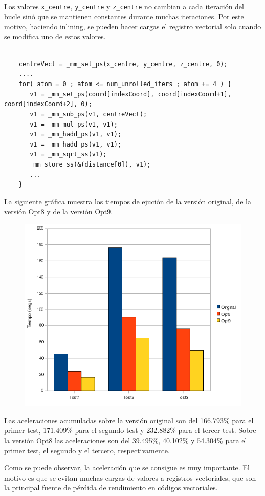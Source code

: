 Los valores \texttt{x\_centre}, \texttt{y\_centre} y \texttt{z\_centre} no
cambian a cada iteraci\'{o}n del bucle sin\'{o} que se mantienen constantes
durante muchas iteraciones. Por este motivo, haciendo inlining, se pueden
hacer cargas el registro vectorial solo cuando se modifica uno de estos valores.

\begin{lstlisting}

    centreVect = _mm_set_ps(x_centre, y_centre, z_centre, 0);
    ....
    for( atom = 0 ; atom <= num_unrolled_iters ; atom += 4 ) {
       v1 = _mm_set_ps(coord[indexCoord], coord[indexCoord+1], coord[indexCoord+2], 0);
       v1 = _mm_sub_ps(v1, centreVect);
       v1 = _mm_mul_ps(v1, v1);
       v1 = _mm_hadd_ps(v1, v1);
       v1 = _mm_hadd_ps(v1, v1);
       v1 = _mm_sqrt_ss(v1);
       _mm_store_ss(&(distance[0]), v1);
       ...
    }
\end{lstlisting}

La siguiente gr\'{a}fica muestra los tiempos de ejuci\'{o}n de la versi\'{o}n
original, de la versi\'{o}n Opt8 y de la versi\'{o}n Opt9.

\begin{figure}[ht]
   \centering
   \includegraphics[keepaspectratio=true,width=.5\textwidth]{figures/opt9-perf}
\end{figure}

Las aceleraciones acumuladas sobre la versi\'{o}n original son del 166.793\% para el
primer test, 171.409\% para el segundo test y 232.882\% para el tercer test. Sobre
la versi\'{o}n Opt8 las aceleraciones son del 39.495\%, 40.102\% y 54.304\% para el
primer test, el segundo y el tercero, respectivamente.

Como se puede observar, la aceleraci\'{o}n que se consigue es muy importante. El
motivo es que se evitan muchas cargas de valores a registros vectoriales, que
son la principal fuente de p\'{e}rdida de rendimiento en c\'{o}digos vectoriales.

